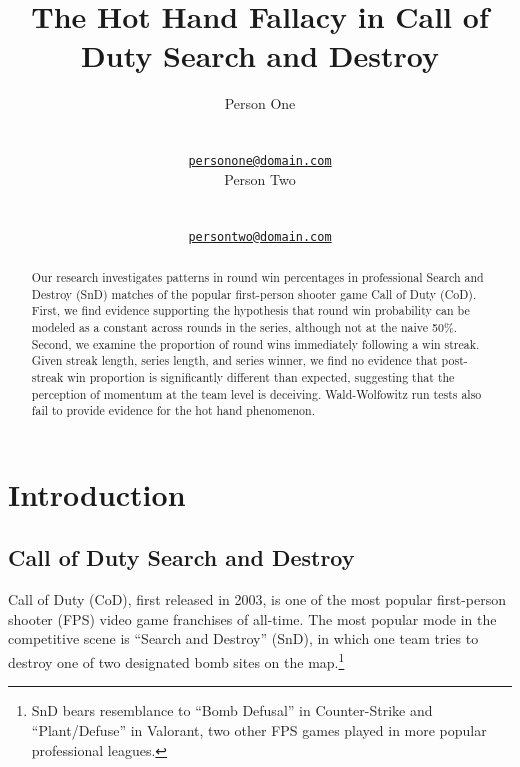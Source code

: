 \documentclass{article}
\title{The Hot Hand Fallacy in Call of Duty Search and Destroy}
\author{
    Person One
   \\
     \\
   \\
  \texttt{\href{mailto:personone@domain.com}{\nolinkurl{personone@domain.com}}} \\
   \And
    Person Two
   \\
     \\
   \\
  \texttt{\href{mailto:persontwo@domain.com}{\nolinkurl{persontwo@domain.com}}} \\
  }
\begin{document}
\maketitle


\begin{abstract}
Our research investigates patterns in round win percentages in
professional Search and Destroy (SnD) matches of the popular
first-person shooter game Call of Duty (CoD). First, we find evidence
supporting the hypothesis that round win probability can be modeled as a
constant across rounds in the series, although not at the naive 50\%.
Second, we examine the proportion of round wins immediately following a
win streak. Given streak length, series length, and series winner, we
find no evidence that post-streak win proportion is significantly
different than expected, suggesting that the perception of momentum at
the team level is deceiving. Wald-Wolfowitz run tests also fail to
provide evidence for the hot hand phenomenon.
\end{abstract}


\hypertarget{introduction}{%
\section{Introduction}\label{introduction}}

\hypertarget{call-of-duty-search-and-destroy}{%
\subsection{Call of Duty Search and
Destroy}\label{call-of-duty-search-and-destroy}}

Call of Duty (CoD), first released in 2003, is one of the most popular
first-person shooter (FPS) video game franchises of all-time. The most
popular mode in the competitive scene is ``Search and Destroy'' (SnD),
in which one team tries to destroy one of two designated bomb sites on
the map.\footnote{SnD bears resemblance to ``Bomb Defusal'' in
  Counter-Strike and ``Plant/Defuse'' in Valorant, two other FPS games
  played in more popular professional leagues.}
\end{document}
